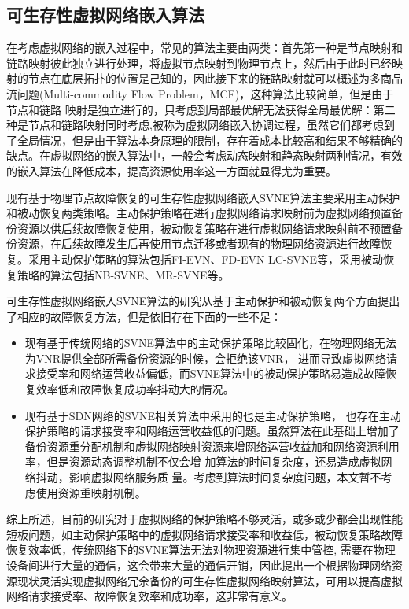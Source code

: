 \subsection{可生存性虚拟网络嵌入算法}
在考虑虚拟网络的嵌入过程中，常见的算法主要由两类：首先第一种是节点映射和链路映射彼此独立进行处理，将虚拟节点映射到物理节点上，然后由于此时已经映射的节点在底层拓扑的位置是己知的，因此接下来的链路映射就可以概述为多商品流问题\cite{even1975complexity}(Multi-commodity Flow Problem，MCF)，这种算法比较简单，但是由于节点和链路 映射是独立进行的，只考虑到局部最优解无法获得全局最优解：第二种是节点和链路映射同时考虑,被称为虚拟网络嵌入协调过程，虽然它们都考虑到了全局情况，但是由于算法本身原理的限制，存在着成本比较高和结果不够精确的缺点。在虚拟网络的嵌入算法中，一般会考虑动态映射和静态映射两种情况，有效的嵌入算法在降低成本，提高资源使用率这一方面就显得尤为重要。



现有基于物理节点故障恢复的可生存性虚拟网络嵌入SVNE算法主要采用主动保护\cite{yu2011cost,wang2014survivable,sun2010efficient,hu2012location} 和被动恢复\cite{rahman2010survivable,qiang2014heuristic,bo2014dynamic}两类策略。主动保护策略在进行虚拟网络请求映射前为虚拟网络预置备份资源以供后续故障恢复使用，被动恢复策略在进行虚拟网络请求映射前不预置备份资源，在后续故障发生后再使用节点迁移或者现有的物理网络资源进行故障恢复。采用主动保护策略的算法包括FI-EVN\cite{yu2011cost}、FD-EVN\cite{wang2014survivable} LC-SVNE\cite{hu2012location}等，采用被动恢复策略的算法包括NB-SVNE\cite{bo2014dynamic}、MR-SVNE\cite{qiang2014heuristic}等。

可生存性虚拟网络嵌入SVNE算法的研究从基于主动保护和被动恢复两个方面提出了相应的故障恢复方法，但是依旧存在下面的一些不足：
\begin{itemize}
  \item 现有基于传统网络的SVNE算法中的主动保护策略比较固化，在物理网络无法为VNR提供全部所需备份资源的时候，会拒绝该VNR， 进而导致虚拟网络请求接受率和网络运营收益偏低，而SVNE算法中的被动保护策略易造成故障恢复效率低和故障恢复成功率抖动大的情况。
  \item 现有基于SDN网络的SVNE相关算法中采用的也是主动保护策略， 也存在主动保护策略的请求接受率和网络运营收益低的问题。虽然算法在此基础上增加了备份资源重分配机制和虚拟网络映射资源来增网络运营收益加和网络资源利用率，但是资源动态调整机制不仅会增 加算法的时间复杂度，还易造成虚拟网络抖动，影响虚拟网络服务质 量。考虑到算法时间复杂度问题，本文暂不考虑使用资源重映射机制。
\end{itemize}

综上所述，目前的研究对于虚拟网络的保护策略不够灵活，或多或少都会出现性能短板问题，如主动保护策略中的虚拟网络请求接受率和收益低，被动恢复策略故障恢复效率低，传统网络下的SVNE算法无法对物理资源进行集中管控, 需要在物理设备间进行大量的通信，这会带来大量的通信开销，因此提出一个根据物理网络资源现状灵活实现虚拟网络冗佘备份的可生存性虚拟网络映射算法，可用以提高虚拟网络请求接受率、故障恢复效率和成功率，这非常有意义。

